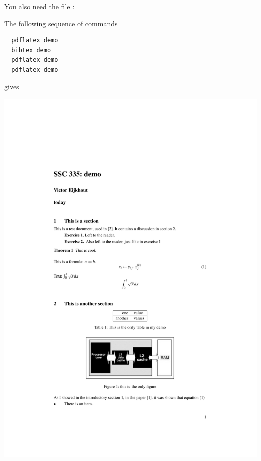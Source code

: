 You also need the file :

\begingroup\small

\endgroup

The following sequence of commands
\begin{verbatim}
  pdflatex demo
  bibtex demo
  pdflatex demo
  pdflatex demo
\end{verbatim}
gives 

\includegraphics[scale=.75]{tutorials-public/latexdemo/demopage1}

